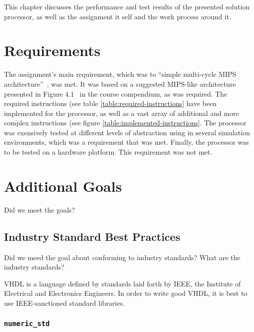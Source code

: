 This chapter discusses the performance and test results of the presented solution processor, as well as the assignment it self and the work process around it.

\section{Requirements}

The assignment's main requirement, which was to ``simple multi-cycle MIPS architecture''~\cite[p.114]{compendium}, was met.
It was based on a suggested MIPS-like architecture presented in Figure 4.1~\cite[p.115]{compendium} in the course compendium, as was required.
The required instructions (see table \vref{table:required-instructions} have been implemented for the processor, as well as a vast array of additional and more complex instructions (see figure \vref{table:implemented-instructions}.
The processor was exensively tested at different levels of abstraction using in several simulation environments, which was a requirement that was met.
Finally, the processor was to be tested on a hardware platform.
This requirement was not met.

\section{Additional Goals}

Did we meet the goals? 

\subsection{Industry Standard Best Practices}

Did we meed the goal about conforming to industry standards?
What are the industry standards?

VHDL is a language defined by standards laid forth by IEEE, the Institute of Electrical and Electronics Engineers.
In order to write good VHDL, it is best to use IEEE-sanctioned standard libraries.

\subsubsection{\texttt{numeric\_std}} \label{sec:numeric-std}


